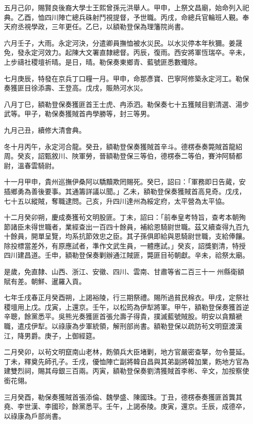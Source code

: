 \begin{pinyinscope}
五月己卯，賜賢良後裔大學士王熙曾孫元洪舉人。甲申，上祭文昌廟，始命列入祀典。乙酉，恤四川陣亡總兵硃射鬥視提督，予世職。丙戌，命總兵官輪班人覲。奉天府丞視學政，三年更任。乙巳，以額勒登保為理籓院尚書。

六月壬子，大雨。永定河決，分遣卿員撫恤被水災民。以水災停本年秋獮。姜晟免，發永定河效力。起陳大文署直隸總督。丙辰，復雨。西安將軍恆瑞卒。辛未，上步禱社稷壇祈晴。是日，晴。勒保奏東鄉青、藍號匪悉數殲除。

七月庚辰，特發在京兵丁口糧一月。甲申，命那彥寶、巴寧阿修築永定河工。勒保奏獲匪目徐添壽、王登高。戊戌，賑熱河水災。

八月丁巳，額勒登保奏獲匪首王士虎、冉添泗。勒保奏七十五獲賊目劉清選、湯步武等。甲子，勒保奏獲賊首冉學勝等，封三等男。

九月己丑，續修大清會典。

冬十月丙午，永定河合龍。癸丑，額勒登保奏獲賊首辛斗。德楞泰奏斃賊首龍紹周。癸亥，詔甄敘川、陜軍勞，晉額勒登保三等伯，德楞泰二等伯，賽沖阿騎都尉，溫春雲騎尉。

十一月甲申，貴州巡撫伊桑阿以驕黷欺罔賜死。癸巳，詔曰：「軍務即日告蕆，安插鄉勇為善後要事。其通籌詳議以聞。」乙未，額勒登保奏獲賊首高見奇。戊戌，七十五以縱賊，奪職逮問。己亥，升四川達州為綏定府，太平營為太平協。

十二月癸卯朔，慶成奏獲茍文明股匪。丁未，詔曰：「前奉皇考特旨，查考本朝殉節諸臣未得世職者，業經查出一百四十餘員，補給恩騎尉世職。茲又續查得九百九十餘員，開單呈覽，均系抗節效忠之臣。其子孫俱即給與恩騎尉世職，支給俸饟。除投標當差外，有原應試者，準作文武生員，一體應試。」癸亥，詔獎劉清，特授四川建昌道。壬申，額勒登保奏剿辦通江賊匪，斃匪目茍朝獻。辛未，祫祭太廟。

是歲，免直隸、山西、浙江、安徽、四川、雲南、甘肅等省二百三十一州縣衛額賦有差。朝鮮、暹羅入貢。

七年壬戌春正月癸酉朔，上謁裕陵，行三期祭禮。賜所過貧民棉衣。甲戌，定祭社稷壇用上戊。戊寅，上還京。壬午，以松筠為伊犁將軍。甲午，額勒登保奏獲首逆辛聰，餘黨悉平。吳熊光奏獲匪首張允壽子得貴，撲滅藍號賊股。明安以貪黷褫職，遣戍伊犁。以祿康為步軍統領，解刑部尚書。額勒登保以疏防茍文明竄渡漢江，降男爵。庚子，上御經筵。

二月癸卯，以茍文明竄南山老林，飭領兵大臣堵剿，地方官嚴密查拏，勿令蔓延。丁未，釋奠先師孔子。壬戌，優恤陣亡副將韓自昌與其弟副將韓加業，飭地方官為建雙烈祠，賜其母銀三百兩。丙寅，額勒登保奏劉清獲賊首李彬、辛文，加按察使銜花翎。

三月癸酉，勒保奏獲賊首張添倫、魏學盛、陳國珠。丁丑，德楞泰奏獲匪首龔其堯、李世漢、李國珍，餘黨悉平。壬午，上謁泰陵。庚寅，還京。壬辰，成德卒，以祿康為戶部尚書。


\end{pinyinscope}

